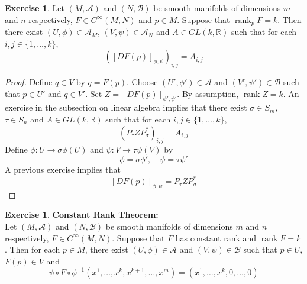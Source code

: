 \documentclass{book}
\theoremstyle{definition}
\newtheorem{ex}[definition]{Exercise}
\newcommand{\sig}{\sigma}
\newcommand{\R}{\mathbb{R}}
\newcommand{\MA}{\mathcal{A}}
\newcommand{\MB}{\mathcal{B}}
\DeclareMathOperator{\rnk}{rank}
\DeclareMathOperator*{\0}{\mbf{0}}
\DeclareMathOperator*{\1}{\mbf{1}}
\newcommand{\tbf}[1]{\textbf{#1}}
\begin{document}
	\begin{ex}
		Let $(M, \MA)$ and $(N, \MB)$ be smooth manifolds of dimensions $m$ and $n$ respectively, $F \in C^{\infty}(M,N)$ and $p \in M$. Suppose that $\rnk_p F = k$. Then there exist $(U, \phi) \in \MA_M$, $(V, \psi) \in \MA_N$ and $A \in GL(k, \R)$ such that for each $i,j \in \{1, \ldots, k\}$, 
		$$([DF(p)]_{\phi, \psi})_{i,j} = A_{i,j} $$
	\end{ex}
	
	\begin{proof}
		Define $q \in V$ by $q = F(p)$. Choose $(U', \phi') \in \MA$ and $(V', \psi') \in \MB$ such that $p \in U'$ and $q \in V'$. Set $Z = [DF(p)]_{\phi', \psi'}$. By assumption, $\rnk Z = k$. An exercise in the subsection on linear algebra implies that there exist $\sig \in S_{m}$, $\tau \in S_{n}$ and $A \in GL(k, \R)$ such that for each $i,j \in \{1, \ldots, k\}$, 
		$$(P_{\tau} Z P_{\sig}^*)_{i, j} = A_{i,j}$$
		Define $\phi: U \rightarrow \sig \phi(U)$ and $\psi: V \rightarrow \tau \psi(V)$ by 
		$$\phi = \sig \phi', \quad \psi = \tau \psi'$$
		A previous exercise implies that 
		$$[DF(p)]_{\phi, \psi} = P_{\tau} Z P_{\sig}^*$$
	\end{proof}
	
	\begin{ex} \tbf{Constant Rank Theorem:} \\
			Let $(M, \MA)$ and $(N, \MB)$ be smooth manifolds of dimensions $m$ and $n$ respectively, $F \in C^{\infty}(M,N)$. Suppose that $F$ has constant rank and $\rnk F = k$. Then for each $p \in M$, there exist $(U, \phi) \in \MA$ and $(V, \psi) \in \MB$ such that $p \in U$, $F(p) \in V$ and
			$$\psi \circ F \circ \phi^{-1}(x^1, \ldots, x^k, x^{k+1}, \ldots, x^m) = (x^1, \ldots, x^k, 0, \ldots, 0)$$ 
	\end{ex}
	
\end{document}

